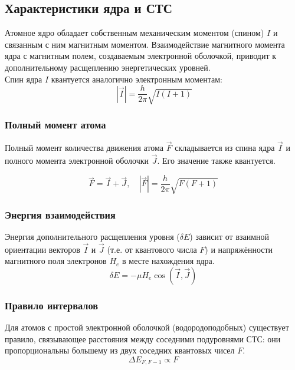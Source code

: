 \documentclass[12pt,a5paper,titlepage, main = russian]{article}
\begin{document}
\subsection{Характеристики ядра и СТС} 
Атомное ядро обладает собственным механическим моментом (спином) \(I\) и связанным с ним магнитным моментом. Взаимодействие магнитного момента ядра с магнитным полем, создаваемым электронной оболочкой, приводит к дополнительному расщеплению энергетических уровней.\\
Спин ядра \(I\) квантуется аналогично электронным моментам:
\begin{equation}
    \ |\vec{I}| = \frac{h}{2\pi}\sqrt{I(I+1)} 
\end{equation}


\subsubsection{Полный момент атома} 
Полный момент количества движения атома \(\vec{F}\) складывается из спина ядра \(\vec{I}\) и полного момента электронной оболочки \(\vec{J}\). Его значение также квантуется.

\begin{equation}
    \vec{F} = \vec{I} + \vec{J},\quad 
    |\vec{F}| = \frac{h}{2\pi}\sqrt{F(F+1)}
\end{equation}

\subsubsection{Энергия взаимодействия} 
Энергия дополнительного расщепления уровня (\(\delta E\)) зависит от взаимной ориентации векторов \(\vec{I}\) и \(\vec{J}\) (т.е. от квантового числа \(F\)) и напряжённости магнитного поля электронов \(H_e\) в месте нахождения ядра.
\begin{equation}
    \delta E = -\mu H_e\cos(\vec{I},\vec{J})
\end{equation}

\subsubsection{Правило интервалов} 
Для атомов с простой электронной оболочкой (водородоподобных) существует правило, связывающее расстояния между соседними подуровнями СТС: они пропорциональны большему из двух соседних квантовых чисел \(F\).
\begin{equation}
    \Delta E_{F,F-1} \propto F 
\end{equation}
\end{document}
